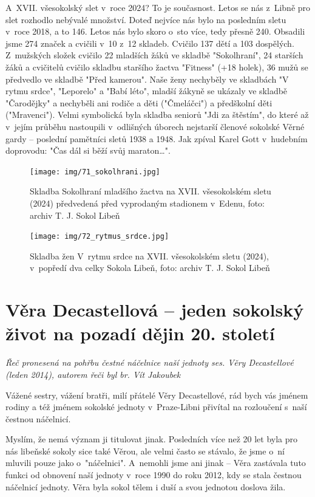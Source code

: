 \documentclass[a5paper, 11pt, twoside]{article}
\begin{document}
A~XVII. všesokolský slet v~roce 2024? To je současnost. Letos se nás
z~Libně pro slet rozhodlo nebývalé množství. Doteď nejvíce nás bylo na
posledním sletu v~roce 2018, a to 146. Letos nás bylo skoro o~sto více,
tedy přesně 240. Obsadili jsme 274 značek a cvičili v~10 z~12 skladeb.
Cvičilo 137 dětí a 103 dospělých. Z~mužských složek cvičilo 22 mladších
žáků ve skladbě "Sokolhraní", 24 starších žáků a cvičitelů cvičilo
skladbu staršího žactva "Fitness" (+18 holek), 36 mužů se předvedlo ve
skladbě "Před kamerou". Naše ženy nechyběly ve skladbách "V rytmu
srdce", "Leporelo" a "Babí léto", mladší žákyně se ukázaly ve
skladbě "Čarodějky" a nechyběli ani rodiče a děti ("Čmeláčci") a
předškolní děti ("Mravenci"). Velmi symbolická byla skladba seniorů
"Jdi za štěstím", do které až v~jejím průběhu nastoupili v~odlišných
úborech nejstarší členové sokolské Věrné gardy -- poslední pamětníci
sletů 1938 a 1948. Jak zpíval Karel Gott v~hudebním doprovodu: "Čas dál
si běží svůj maraton\ldots".

\begin{figure}[hp]
  \centering 
  \texttt{[image: img/71\_sokolhrani.jpg]}
  \caption*{Skladba Sokolhraní mladšího žactva na XVII. všesokolském sletu
  (2024) předvedená před vyprodaným stadionem v~Edenu, foto: archiv T. J.
  Sokol Libeň}
\end{figure}

\begin{figure}[hp]
  \centering 
  \texttt{[image: img/72\_rytmus\_srdce.jpg]}
  \caption*{Skladba žen V~rytmu srdce na XVII. všesokolském sletu (2024),
  v~popředí dva celky Sokola Libeň, foto: archiv T. J. Sokol Libeň}
\end{figure}

\section{Věra Decastellová -- jeden sokolský život na pozadí dějin 20.
století}

\begin{center}
  \textit{Řeč pronesená na pohřbu čestné náčelnice naší jednoty ses. Věry
  Decastellové (leden 2014), autorem řeči byl br. Vít Jakoubek}
\end{center}

\noindent
Vážené sestry, vážení bratři, milí přátelé Věry Decastellové, rád bych
vás jménem rodiny a též jménem sokolské jednoty v~Praze-Libni přivítal
na rozloučení s~naší čestnou náčelnicí.

Myslím, že nemá význam ji titulovat jinak. Posledních více než 20 let
byla pro nás libeňské sokoly sice také Věrou, ale velmi často se
stávalo, že jsme o~ní mluvili pouze jako o~"náčelnici". A~nemohli jsme
ani jinak -- Věra zastávala tuto funkci od obnovení naší jednoty v~roce
1990 do roku 2012, kdy se stala čestnou náčelnicí jednoty. Věra byla
sokol tělem i duší a svou jednotou doslova žila.
\end{document}
